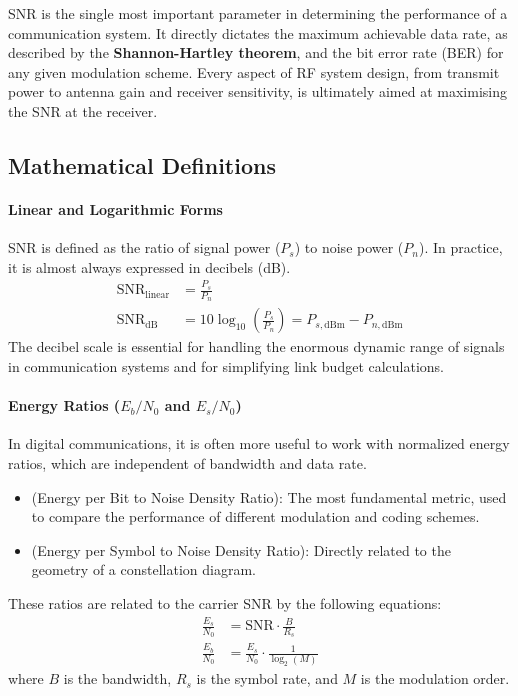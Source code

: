 \begin{keyconcept}
    SNR is the single most important parameter in determining the performance of a communication system. It directly dictates the maximum achievable data rate, as described by the \textbf{Shannon-Hartley theorem}, and the bit error rate (BER) for any given modulation scheme. Every aspect of RF system design, from transmit power to antenna gain and receiver sensitivity, is ultimately aimed at maximising the SNR at the receiver.
\end{keyconcept}


\subsection{Mathematical Definitions}

\paragraph{Linear and Logarithmic Forms}
SNR is defined as the ratio of signal power ($P_s$) to noise power ($P_n$). In practice, it is almost always expressed in decibels (dB).
\begin{align}
    \text{SNR}_{\text{linear}} &= \frac{P_s}{P_n} \\
    \text{SNR}_{\text{dB}} &= 10\log_{10}\left(\frac{P_s}{P_n}\right) = P_{s, \text{dBm}} - P_{n, \text{dBm}}
\end{align}
The decibel scale is essential for handling the enormous dynamic range of signals in communication systems and for simplifying link budget calculations.

\paragraph{Energy Ratios ($E_b/N_0$ and $E_s/N_0$)}
In digital communications, it is often more useful to work with normalized energy ratios, which are independent of bandwidth and data rate.
\begin{itemize}
    \item {} (Energy per Bit to Noise Density Ratio): The most fundamental metric, used to compare the performance of different modulation and coding schemes.
    \item {} (Energy per Symbol to Noise Density Ratio): Directly related to the geometry of a constellation diagram.
\end{itemize}
These ratios are related to the carrier SNR by the following equations:
\begin{align}
    \frac{E_s}{N_0} &= \text{SNR} \cdot \frac{B}{R_s} \\
    \frac{E_b}{N_0} &= \frac{E_s}{N_0} \cdot \frac{1}{\log_2(M)}
\end{align}
where $B$ is the bandwidth, $R_s$ is the symbol rate, and $M$ is the modulation order.

